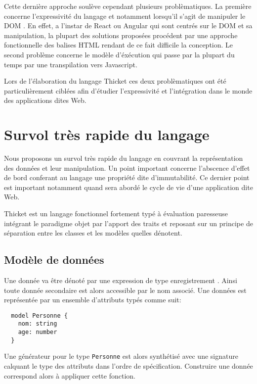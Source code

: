 \documentclass[twoside,a4paper]{article}
\begin{document}
Cette dernière approche soulève cependant plusieurs problèmatiques. La
première  concerne l'expressivité  du langage  et notamment  lorsqu'il
s'agit de manipuler  le DOM \cite{dom}. En effet, a  l'instar de React
\cite{reacjs} ou Angular  \cite{angular2} qui sont centrés  sur le DOM
et sa manipulation,  la plupart des solutions  proposées procédent par
une  approche  fonctionnelle  des  balises HTML  rendant  de  ce  fait
difficile  la  conception.  Le  second  problème  concerne  le  modèle
d'éxécution qui  passe par la  plupart du temps par  une transpilation
vers Javascript.

Lors de l'élaboration  du langage Thicket ces  deux problèmatiques ont
été   particulièrement  ciblées   afin  d'étudier   l'expressivité  et
l'intégration dans le monde des applications dites Web.

\section{Survol très rapide du langage}

Nous  proposons  un survol  très  rapide  du  langage en  couvrant  la
représentation des  données et  leur manipulation. Un  point important
concerne l'abscence d'effet de bord conferant au langage une propriété
dite d'immutabilité.  Ce dernier  point est important  notamment quand
sera abordé le cycle de vie d'une application dite Web.

Thicket  est  un  langage  fonctionnel  fortement  typé  à  évaluation
paresseuse  intégrant  le  paradigme  objet par  l'apport  des  traits
\cite{trait}  et reposant  sur  un principe  de  séparation entre  les
classes et les modèles quelles dénotent.

\subsection{Modèle de données}

Une donnée  va être dénoté  par une expression de  type enregistrement
\cite{recordcalculus}.   Ainsi  toute   donnée  secondaire  est  alors
accessible  par le  nom associé.  Une données  est représentée  par un
ensemble d'attributs typés comme suit:

\lstset{language=Thicket}
\begin{lstlisting}
  model Personne {  
    nom: string   
    age: number
  }
\end{lstlisting}

Une générateur pour le type {\tt Personne} est alors synthétisé avec une
signature   calquant   le  type   des   attributs   dans  l'ordre   de
spécification.   Construire une  donnée correspond  alors à  appliquer
cette fonction.
\end{document}
